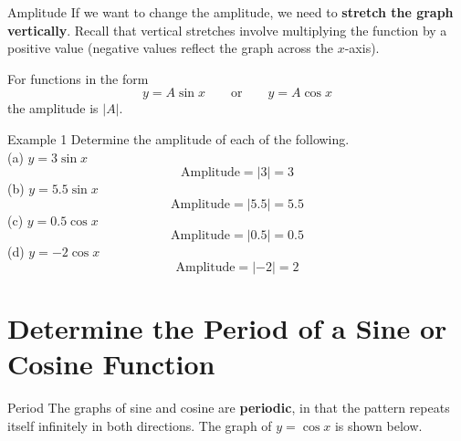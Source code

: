 \documentclass[t,usenames,dvipsnames]{beamer}
\begin{document}
\begin{frame}{Amplitude}
If we want to change the amplitude, we need to \textbf{stretch the graph vertically}. Recall that vertical stretches involve multiplying the function by a positive value (negative values reflect the graph across the $x$-axis).  \newline\\   \pause

For functions in the form
\[
y = A\sin x \qquad \text{or} \qquad y = A\cos x
\]
the amplitude is $|A|$.
\end{frame}

\begin{frame}{Example 1}
Determine the amplitude of each of the following.   \newline\\
(a) \quad $y = 3\sin x$ \pause
\[
\text{Amplitude} = |3| = 3
\]
\pause
(b) \quad $y = 5.5\sin x$   \pause
\[
\text{Amplitude} = |5.5| = 5.5
\]
\pause
(c) \quad $y = 0.5\cos x$   \pause
\[
\text{Amplitude} = |0.5| = 0.5
\]
\pause
(d) \quad $y = -2\cos x$    \pause
\[
\text{Amplitude} = |-2| = 2
\]
\end{frame} 

\section{Determine the Period of a Sine or Cosine Function}

\begin{frame}{Period}
The graphs of sine and cosine are \textbf{periodic}, in that the pattern repeats itself infinitely in both directions. The graph of $y = \cos x$ is shown below.    \newline\\ 

\begin{center}
\end{center}
\end{frame}
\end{document}
